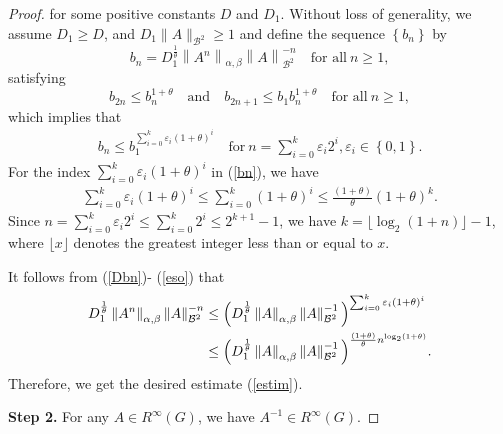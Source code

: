 \documentclass[preprint,11pt]{elsarticle}
\numberwithin{equation}{section}
\begin{document}
\begin{proof}
		for some positive constants $D$ and $D_1$. Without loss of generality, we assume $D_1\geq D$, and $D_1\|A\|_{\mathcal{B}^2}\geq 1$ and define the sequence $\left \{ b_{n} \right \} $ by
		\begin{equation}\label{Dbn}
			b_{n}=D_{1}^{\frac{1}{\theta } }\left \| A^{n} \right \| _{\alpha,\beta }\left \| A \right \|_{\mathcal{B} ^{2}}^{-n} \quad\text{for~all}~ n\ge1,
		\end{equation}
		satisfying
		\begin{equation*}
			b_{2n}\le b_{n}^{1+\theta } \quad \text {and} \quad b_{2n+1}\le b_{1}b_{n}^{1+\theta }    \quad\text{for~all}~ n\ge 1,
		\end{equation*}
		which implies that
		\begin{align}\label{bn}
			b_{n}\le b_{1}^{\sum_{i=0}^{k } \varepsilon _{i}(1+\theta) ^{i}}\quad \text{for}~n=\sum_{i=0}^{k}\varepsilon _{i}2^{i}, \varepsilon _{i}\in \left \{ 0,1 \right \}.
		\end{align}
		For the index 
		$\sum_{i=0}^{k } \varepsilon _{i}(1+\theta) ^{i}$ in (\ref{bn}), we have
		\begin{align}\label{eso}
			{\sum_{i=0}^{k } \varepsilon _{i}(1+\theta) ^{i}}\le {\sum_{i=0}^{k } (1+\theta) ^{i}}%
			\le\frac{(1+\theta)}{\theta}(1+\theta)^{k}.
		\end{align}
		Since $n=\sum_{i=0}^{k}\varepsilon _{i}2^{i}\le\sum_{i=0}^{k}2^{i}\le 2^{k+1}-1$, we have $k= \lfloor \log_2(1+n)\rfloor-1$, where $\lfloor x\rfloor$ denotes the greatest integer less than or equal to $x$. 
		
		\noindent It follows from (\ref{Dbn})- (\ref{eso}) that
		\begin{align*}
			D_{1}^{\frac{1}{\theta } }\left \| A^{n} \right \| _{\alpha,\beta }\left \| A \right \|_{\mathcal{B} ^{2}}^{-n}&\le \Big ( D_{1}^{\frac{1}{\theta } }\left \| A \right \| _{\alpha,\beta }\left \| A \right \|_{\mathcal{B} ^{2}}^{-1} \Big ) ^{{\sum_{i=0}^{k } \varepsilon _{i}(1+\theta) ^{i}} }\notag\\
			&\le \Big ( D_{1}^{\frac{1}{\theta } }\left \| A \right \|_{\alpha,\beta } \left \| A \right \|^{-1} _{\mathcal{B} ^{2}} \Big ) ^{\frac{(1+\theta)}{\theta}n^{\log_2(1+\theta)}}.
		\end{align*}
		Therefore, we get the desired estimate (\ref{estim}).
		
		{\bf Step 2.} For any $A\in  R^{\infty }(G)$, we have $A^{-1}\in  R^{\infty }(G)$.
		

\end{proof}
\end{document}
